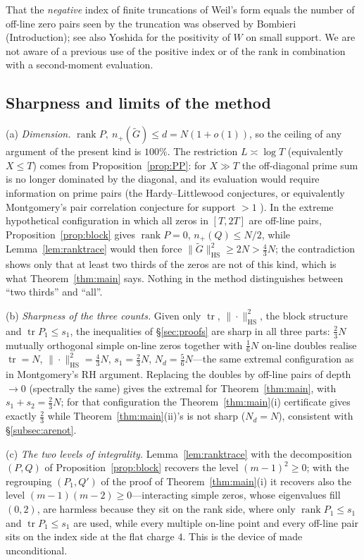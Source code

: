 \documentclass[11pt]{amsart}
\theoremstyle{definition}
\theoremstyle{remark}
\numberwithin{equation}{section}
\DeclareMathOperator{\tr}{tr}
\DeclareMathOperator{\rank}{rank}
\newcommand{\Gt}{\widetilde{G}}
\newcommand{\npl}{n_{+}}
\newcommand{\HS}{\mathrm{HS}}
\begin{document}
That the \emph{negative} index of finite truncations of Weil's form equals the number of off-line zero pairs seen by the truncation was observed by Bombieri \cite{Bom00} (Introduction); see also Yoshida \cite{Yos92} for the positivity of $W$ on small support. We are not aware of a previous use of the positive index or of the rank in combination with a second-moment evaluation.

\subsection{Sharpness and limits of the method}\label{subsec:limits}
(a) \emph{Dimension.} $\rank P,\ \npl(\Gt)\le d=N(1+o(1))$, so the ceiling of any argument of the present kind is $100\%$. The restriction $L\asymp\log T$ (equivalently $X\le T$) comes from Proposition~\ref{prop:PP}: for $X\gg T$ the off-diagonal prime sum is no longer dominated by the diagonal, and its evaluation would require information on prime pairs (the Hardy--Littlewood conjectures, or equivalently Montgomery's pair correlation conjecture for support $>1$ \cite{Mon73,GM87}). In the extreme hypothetical configuration in which all zeros in $[T,2T]$ are off-line pairs, Proposition~\ref{prop:block} gives $\rank P=0$, $\npl(Q)\le N/2$, while Lemma~\ref{lem:ranktrace} would then force $\|\Gt\|_{\HS}^2\ge2N>\frac43N$; the contradiction shows only that at least two thirds of the zeros are not of this kind, which is what Theorem~\ref{thm:main} says. Nothing in the method distinguishes between ``two thirds'' and ``all''.

(b) \emph{Sharpness of the three counts.} Given only $\tr$, $\|\cdot\|_{\HS}^2$, the block structure and $\tr P_1\le s_1$, the inequalities of \S\ref{sec:proofs} are sharp in all three parts: $\frac23N$ mutually orthogonal simple on-line zeros together with $\frac16N$ on-line doubles realise $\tr=N$, $\|\cdot\|_{\HS}^2=\frac43N$, $s_1=\frac23N$, $N_d=\frac56N$---the same extremal configuration as in Montgomery's RH argument. Replacing the doubles by off-line pairs of depth $\to0$ (spectrally the same) gives the extremal for Theorem~\ref{thm:main}, with $s_1+s_2=\frac23N$; for that configuration the Theorem~\ref{thm:main}(i) certificate gives exactly $\frac23$ while Theorem~\ref{thm:main}(ii)'s is not sharp ($N_d=N$), consistent with \S\ref{subsec:arenot}.

(c) \emph{The two levels of integrality.} Lemma~\ref{lem:ranktrace} with the decomposition $(P,Q)$ of Proposition~\ref{prop:block} recovers the level $(m-1)^2\ge0$; with the regrouping $(P_1,Q')$ of the proof of Theorem~\ref{thm:main}(i) it recovers also the level $(m-1)(m-2)\ge0$---interacting simple zeros, whose eigenvalues fill $(0,2)$, are harmless because they sit on the rank side, where only $\rank P_1\le s_1$ and $\tr P_1\le s_1$ are used, while every multiple on-line point and every off-line pair sits on the index side at the flat charge $4$. This is the device of \cite[(1.2)]{CGG98} made unconditional.
\end{document}
